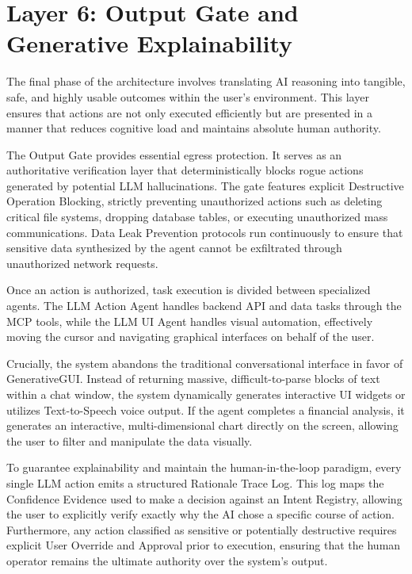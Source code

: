 \documentclass[12pt, a4paper]{report}
\begin{document}
\section{Layer 6: Output Gate and Generative Explainability}
The final phase of the architecture involves translating AI reasoning into tangible, safe, and highly usable outcomes within the user's environment.\cite{hojo2025} This layer ensures that actions are not only executed efficiently but are presented in a manner that reduces cognitive load and maintains absolute human authority.

The Output Gate provides essential egress protection. It serves as an authoritative verification layer that deterministically blocks rogue actions generated by potential LLM hallucinations.\cite{hojo2025} The gate features explicit Destructive Operation Blocking, strictly preventing unauthorized actions such as deleting critical file systems, dropping database tables, or executing unauthorized mass communications.\cite{hojo2025} Data Leak Prevention protocols run continuously to ensure that sensitive data synthesized by the agent cannot be exfiltrated through unauthorized network requests.

Once an action is authorized, task execution is divided between specialized agents. The LLM Action Agent handles backend API and data tasks through the MCP tools, while the LLM UI Agent handles visual automation, effectively moving the cursor and navigating graphical interfaces on behalf of the user.\cite{hojo2025}

Crucially, the system abandons the traditional conversational interface in favor of GenerativeGUI.\cite{hojo2025} Instead of returning massive, difficult-to-parse blocks of text within a chat window, the system dynamically generates interactive UI widgets or utilizes Text-to-Speech voice output.\cite{hojo2025} If the agent completes a financial analysis, it generates an interactive, multi-dimensional chart directly on the screen, allowing the user to filter and manipulate the data visually.\cite{arxiv2508}

To guarantee explainability and maintain the human-in-the-loop paradigm, every single LLM action emits a structured Rationale Trace Log.\cite{hojo2025} This log maps the Confidence Evidence used to make a decision against an Intent Registry, allowing the user to explicitly verify exactly why the AI chose a specific course of action.\cite{hojo2025} Furthermore, any action classified as sensitive or potentially destructive requires explicit User Override and Approval prior to execution, ensuring that the human operator remains the ultimate authority over the system's output.\cite{hojo2025}
\end{document}
